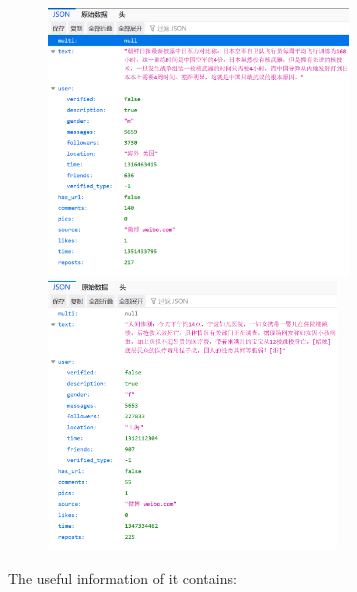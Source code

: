 \documentclass[12pt,a4paper]{article}
\begin{document}
\begin{figure}[htbp]
	\centering
	\begin{minipage}{0.49\linewidth}
		\includegraphics[height=2.8in]{pic/example}
	\end{minipage}
\hfil
	\begin{minipage}{0.49\linewidth}
		\includegraphics[height=2.8in]{pic/example2}
	\end{minipage}
\end{figure}
\clearpage
The useful information of it contains:
\end{document}
